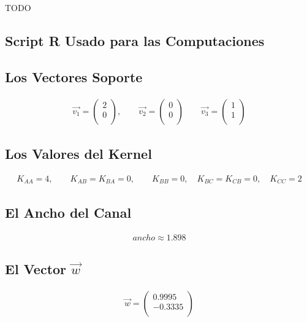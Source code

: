 \documentclass[fleqn]{llncs}
\begin{document}
TODO

\subsection{Script R Usado para las Computaciones}


\newpage

\subsection{Los Vectores Soporte}
\begin{align*}
	\overrightarrow{v_1} =
	\begin{pmatrix}
		2 \\
		0 \\
	\end{pmatrix},
	\qquad
	\overrightarrow{v_2} =
	\begin{pmatrix}
		0 \\
		0 \\
	\end{pmatrix}
	\qquad
	\overrightarrow{v_3} =
	\begin{pmatrix}
		1 \\
		1 \\
	\end{pmatrix}
\end{align*}

\subsection{Los Valores del Kernel}
\begin{align*}
	K_{AA} = 4,
	\qquad
	K_{AB} = K_{BA} = 0,
	\qquad
	K_{BB} = 0,
	\quad
	K_{BC} = K_{CB} = 0,
	\quad
	K_{CC} = 2
\end{align*}

\subsection{El Ancho del Canal}
\begin{align*}
	ancho \approx 1.898
\end{align*}

\subsection{El Vector $\overrightarrow{w}$}
\begin{align*}
	\overrightarrow{w} =
	\begin{pmatrix}
		0.9995 \\
		-0.3335 \\
	\end{pmatrix}
\end{align*}
\end{document}
